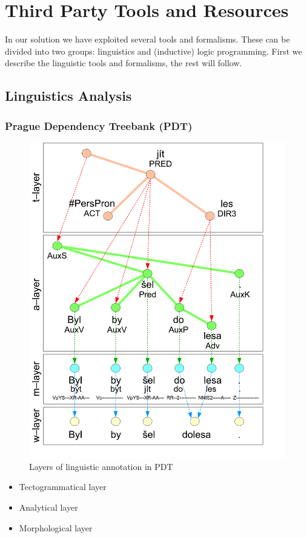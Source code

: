 \chapter{Third Party Tools and Resources}

\graphicspath{{../img/ch30/}}


In our solution we have exploited several tools and formalisms. These can be divided into two groups: linguistics and (inductive) logic programming. First we describe the linguistic tools and formalisms, the rest will follow.

\section{Linguistics Analysis} \label{sec:ch30_ling_tools}


\subsection{Prague Dependency Treebank (PDT)}

\begin{figure}
\centerline{\includegraphics[width=0.6\hsize]{PDT_layers}}
\caption{Layers of linguistic annotation in PDT}
\label{fig:ch30_layers}
\end{figure}


\begin{itemize}
	\item Tectogrammatical layer
	\item Analytical layer
	\item Morphological layer
\end{itemize}

